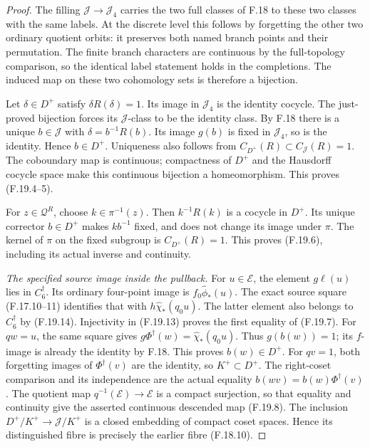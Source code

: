 \begin{proof}
The filling \(\mathcal J\to\mathcal J_4\) carries
the two full classes of F.18 to these two classes
with the same labels.
At the discrete level this follows by forgetting
the other two ordinary quotient orbits: it preserves
both named branch points and their permutation.
The finite branch characters are continuous by
the full-topology comparison, so the identical
label statement holds in the completions.
The induced map on these two cohomology sets is
therefore a bijection.

Let \(\delta\in D^+\) satisfy \(\delta R(\delta)=1\).
Its image in \(\mathcal J_4\) is the identity
cocycle.  The just-proved bijection forces its
\(\mathcal J\)-class to be the identity class.
By F.18 there is a unique \(b\in\mathcal J\) with
\(\delta=b^{-1}R(b)\).
Its image \(g(b)\) is fixed in \(\mathcal J_4\),
so is the identity.
Hence \(b\in D^+\).
Uniqueness also follows from
\(C_{D^+}(R)\subset C_{\mathcal J}(R)=1\).
The coboundary map is continuous; compactness of
\(D^+\) and the Hausdorff cocycle space make this
continuous bijection a homeomorphism.
This proves (F.19.4--5).

For \(z\in\mathcal Q^R\), choose \(k\in\pi^{-1}(z)\).
Then \(k^{-1}R(k)\) is a cocycle in \(D^+\).
Its unique corrector \(b\in D^+\) makes
\(kb^{-1}\) fixed, and does not change its image
under \(\pi\).
The kernel of \(\pi\) on the fixed subgroup is
\(C_{D^+}(R)=1\).
This proves (F.19.6), including its actual inverse
and continuity.

\emph{The specified source image inside the pullback.}
For \(u\in\mathcal E\), the element \(g\ell(u)\)
lies in \(C_6^\dagger\).
Its ordinary four-point image is
\(f_0\widehat\phi_*(u)\).
The exact source square (F.17.10--11) identifies
that with \(h\widehat\chi_*(q_0u)\).
The latter element also belongs to \(C_6^\dagger\)
by (F.19.14).
Injectivity in (F.19.13) proves the first equality
of (F.19.7).
For \(qw=u\), the same square gives
\(g\Phi^\dagger(w)=\widehat\chi_*(q_0u)\).
Thus \(g(b(w))=1\); its \(f\)-image is already
the identity by F.18.
This proves \(b(w)\in D^+\).
For \(qv=1\), both forgetting images of
\(\Phi^\dagger(v)\) are the identity, so
\(K^+\subset D^+\).
The right-coset comparison and its independence
are the actual equality
\(b(wv)=b(w)\Phi^\dagger(v)\).
The quotient map \(q^{-1}(\mathcal E)\to\mathcal E\)
is a compact surjection, so that equality and
continuity give the asserted continuous descended
map (F.19.8).
The inclusion \(D^+/K^+\to\mathcal J/K^+\)
is a closed embedding of compact coset spaces.
Hence its distinguished fibre is precisely
the earlier fibre (F.18.10).


\end{proof}
